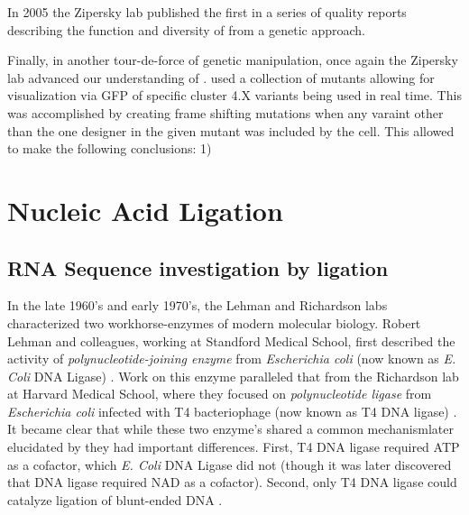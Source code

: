     In 2005 the Zipersky lab published \citep{Hattori2005a} the first in a series of quality reports describing the function and diversity of \dscam{} from a genetic approach. \citep{Hattori2008,Hattori2009} 

    Finally, in another tour-de-force of genetic manipulation, once again the Zipersky lab advanced our understanding of \dscam{}. \citep{Miura2013b} used a collection of \dscam{} mutants allowing for visualization via GFP of specific cluster 4.X variants being used in real time. This was accomplished by creating frame shifting mutations when any varaint other than the one designer in the given mutant was included by the cell. This allowed \citet{Miura2013b} to make the following conclusions: 1) 


\section{Nucleic Acid Ligation}\label{hd:Nucleic Acid Ligation}

  \subsection{RNA Sequence investigation by ligation}\label{sec:Ligation}

    In the late 1960's and early 1970's, the Lehman and Richardson labs characterized two workhorse-enzymes of modern molecular biology. Robert Lehman and colleagues, working at Standford Medical School, first described the activity of \textit{polynucleotide-joining enzyme} from \textit{Escherichia coli} (now known as \textit{E. Coli} DNA Ligase) \citep{Olivera1967b}. Work on this enzyme paralleled that from the Richardson lab at Harvard Medical School, where they focused on \textit{polynucleotide ligase} from \textit{Escherichia coli} infected with T4 bacteriophage (now known as T4 DNA ligase) \citep{Weiss1967a}. It became clear that while these two enzyme's shared a common mechanism\textemdash later elucidated by \citep{Modrich1973a}\textemdash they had important differences. First, T4 DNA ligase required ATP as a cofactor, which \textit{E. Coli} DNA Ligase did not (though it was later discovered that DNA ligase required NAD as a cofactor). Second, only T4 DNA ligase could catalyze ligation of blunt-ended DNA \citep{Tabor1987a}.

